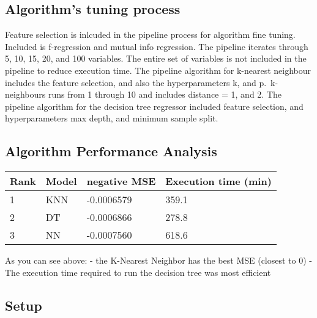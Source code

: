 \documentclass[11pt]{article}
\begin{document}
    \hypertarget{algorithms-tuning-process}{%
\subsection{Algorithm's tuning
process}\label{algorithms-tuning-process}}

Feature selection is inlcuded in the pipeline process for algorithm fine
tuning. Included is f-regression and mutual info regression. The
pipeline iterates through 5, 10, 15, 20, and 100 variables. The entire
set of variables is not included in the pipeline to reduce execution
time. The pipeline algorithm for k-nearest neighbour includes the
feature selection, and also the hyperparameters k, and p.~k-neighbours
runs from 1 through 10 and includes distance = 1, and 2. The pipeline
algorithm for the decision tree regressor included feature selection,
and hyperparameters max depth, and minimum sample split.

    \hypertarget{algorithm-performance-analysis}{%
\subsection{Algorithm Performance
Analysis}\label{algorithm-performance-analysis}}

\begin{longtable}[]{@{}llll@{}}
\toprule
Rank & Model & negative MSE & Execution time (min)\tabularnewline
\midrule
\endhead
1 & KNN & -0.0006579 & 359.1\tabularnewline
2 & DT & -0.0006866 & 278.8\tabularnewline
3 & NN & -0.0007560 & 618.6\tabularnewline
\bottomrule
\end{longtable}

As you can see above: - the K-Nearest Neighbor has the best MSE (closest
to 0) - The execution time required to run the decision tree was most
efficient

    \hypertarget{setup}{%
\subsection{Setup}\label{setup}}
\end{document}
